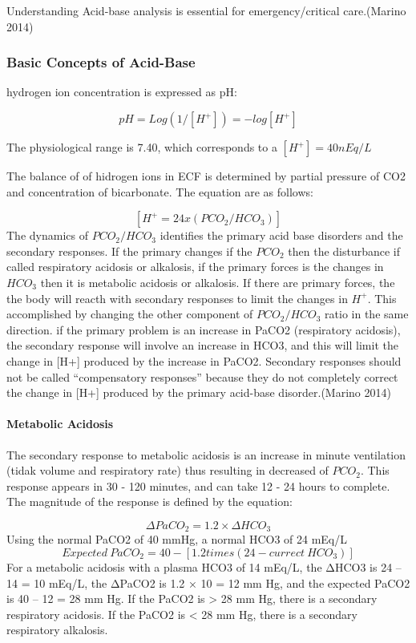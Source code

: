 \documentclass[
  letterpaper,
  DIV=11,
  numbers=noendperiod]{scrreprt}
\let\oldparagraph\paragraph
\renewcommand{\paragraph}[1]{\oldparagraph{#1}\mbox{}}
\begin{document}
Understanding Acid-base analysis is essential for emergency/critical
care.(Marino 2014)

\subsubsection{Basic Concepts of
Acid-Base}\label{basic-concepts-of-acid-base}

hydrogen ion concentration is expressed as pH:

\[
pH = Log (1/[H^+]) = - log [H^+]
\]

The physiological range is 7.40, which corresponds to a
\([H^+] = 40 nEq/L\)

The balance of of hidrogen ions in ECF is determined by partial pressure
of CO2 and concentration of bicarbonate. The equation are as follows:

\[
[H^+ = 24 x (PCO_2 / HCO_3)]
\] The dynamics of \(PCO_2 / HCO_3\) identifies the primary acid base
disorders and the secondary responses. If the primary changes if the
\(PCO_2\) then the disturbance if called respiratory acidosis or
alkalosis, if the primary forces is the changes in \(HCO_3\) then it is
metabolic acidosis or alkalosis. If there are primary forces, the the
body will reacth with secondary responses to limit the changes in
\(H^+\). This accomplished by changing the other component of
\(PCO_2 / HCO_3\) ratio in the same direction. if the primary problem is
an increase in PaCO2 (respiratory acidosis), the secondary response will
involve an increase in HCO3, and this will limit the change in {[}H+{]}
produced by the increase in PaCO2. Secondary responses should not be
called ``compensatory responses'' because they do not completely correct
the change in {[}H+{]} produced by the primary acid-base
disorder.(Marino 2014)

\paragraph{Metabolic Acidosis}\label{metabolic-acidosis-1}

The secondary response to metabolic acidosis is an increase in minute
ventilation (tidak volume and respiratory rate) thus resulting in
decreased of \(PCO_2\). This response appears in 30 - 120 minutes, and
can take 12 - 24 hours to complete. The magnitude of the response is
defined by the equation:

\[
\Delta PaCO_2 = 1.2 \times \Delta HCO_3
\] Using the normal PaCO2 of 40 mmHg, a normal HCO3 of 24 mEq/L \[
Expected \ PaCO_2 = 40 - [1.2 times (24 - currect \  HCO_3)]
\] For a metabolic acidosis with a plasma HCO3 of 14 mEq/L, the ΔHCO3 is
24 -- 14 = 10 mEq/L, the ΔPaCO2 is 1.2 × 10 = 12 mm Hg, and the expected
PaCO2 is 40 -- 12 = 28 mm Hg. If the PaCO2 is \textgreater{} 28 mm Hg,
there is a secondary respiratory acidosis. If the PaCO2 is \textless{}
28 mm Hg, there is a secondary respiratory alkalosis.
\end{document}
